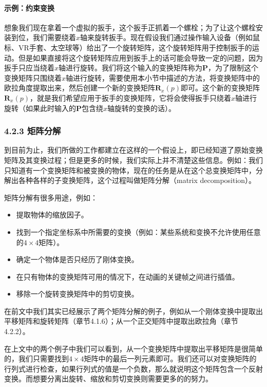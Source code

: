 \documentclass[
  paper=a4,
  ,captions=tableheading
]{scrartcl}
\providecommand{\tightlist}{%
  \setlength{\itemsep}{0pt}\setlength{\parskip}{0pt}}
\begin{document}
\paragraph{示例：约束变换}\label{ux793aux4f8bux7ea6ux675fux53d8ux6362}

想象我们现在拿着一个虚拟的扳手，这个扳手正抓着一个螺栓；为了让这个螺栓安装到位，我们需要绕着\(x\)轴来旋转扳手。现在假设我们通过操作输入设备（例如鼠标、VR手套、太空球等）给出了一个旋转矩阵，这个旋转矩阵用于控制扳手的运动。但是如果直接将这个旋转矩阵应用到扳手上的话可能会导致一定的问题，因为扳手只应当绕着\(x\)轴进行旋转。我们将这个输入的变换矩阵称为\(\mathbf{P}\)，为了限制这个变换矩阵只围绕着\(x\)轴进行旋转，需要使用本小节中描述的方法，将变换矩阵中的欧拉角度提取出来，然后创建一个新的变换矩阵\(\mathbf{R}_x(p)\)即可。这个新的变换矩阵\(\mathbf{R}_x(p)\)，就是我们希望应用于扳手的变换矩阵，它将会使得扳手只绕着\(x\)轴进行旋转（如果此时输入的\(\mathbf{P}\)包含绕\(x\)轴旋转的变换的话）。

\subsubsection{4.2.3 矩阵分解}\label{ux77e9ux9635ux5206ux89e3}

到目前为止，我们所做的工作都建立在这样的一个假设上，即已经知道了原始变换矩阵及其变换过程；但是更多的时候，我们实际上并不清楚这些信息。例如：我们只知道有一个变换矩阵和被变换的物体，现在的任务是从在这个总变换矩阵中，分解出各种各样的子变换矩阵，这个过程叫做矩阵分解（matrix
decomposition）。

矩阵分解有很多用途，例如：

\begin{itemize}
  \tightlist
  \item
        提取物体的缩放因子。
  \item
        找到一个指定坐标系中所需要的变换（例如：某些系统和变换不允许使用任意的\(4 \times 4\)矩阵）。
  \item
        确定一个物体是否只经历了刚体变换。
  \item
        在只有物体的变换矩阵可用的情况下，在动画的关键帧之间进行插值。
  \item
        移除一个旋转变换矩阵中的剪切变换。
\end{itemize}

在前文中我们其实已经展示了两个矩阵分解的例子，例如从一个刚体变换中提取出平移矩阵和旋转矩阵（章节4.1.6）；从一个正交矩阵中提取出欧拉角（章节4.2.2）。

在上文中的两个例子中我们可以看到，从一个变换矩阵中提取出平移矩阵是很简单的，我们只需要找到\(4 \times 4\)矩阵中的最后一列元素即可。我们还可以对变换矩阵的行列式进行检查，如果行列式的值是一个负数，那么就说明这个矩阵包含一个反射变换。而想要分离出旋转、缩放和剪切变换则需要更多的的努力。
\end{document}
